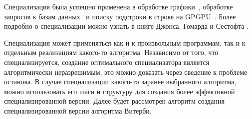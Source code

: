Специализация была успешно применена в обработке 
графики~\cite{RT_spec}, обработке запросов к базам 
данных~\cite{SQL_spec} и поиску подстроки в строке на 
GPGPU~\cite{part_eval_GPU}.
Более подробно о специализации можно узнать в книге Джонса, 
Гомарда и Сестофта \cite{Jones_spec}.

Специализация может применяться как и к произвольным 
программам, так и к отдельным реализациям какого-то 
алгоритма.
Независимо от того, что специализируется, создание 
оптимального специализатора является алгоритмически 
неразрешимым, это можно доказать через сведение к проблеме 
останова.
В случае специализации какого-то заранее выбранного 
алгоритма, можно использовать его шаги и структуру для 
создания более эффективной специализированной версии.
Далее будет рассмотрен алгоритм создания специализированной 
версии алгоритма Витерби.
